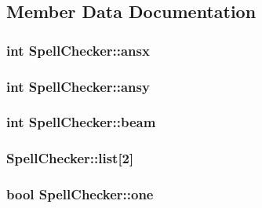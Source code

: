 \subsection{Member Data Documentation}
\hypertarget{class_spell_checker_a7c04bca12734e76005fe2535a3698ea5}{
\subsubsection[{ansx}]{\setlength{\rightskip}{0pt plus 5cm}int Spell\+Checker\+::ansx\hspace{0.3cm}{\ttfamily [private]}}}\label{class_spell_checker_a7c04bca12734e76005fe2535a3698ea5}
\hypertarget{class_spell_checker_aca76cb3fc436ef3970a100a950c4f11a}{
\subsubsection[{ansy}]{\setlength{\rightskip}{0pt plus 5cm}int Spell\+Checker\+::ansy\hspace{0.3cm}{\ttfamily [private]}}}\label{class_spell_checker_aca76cb3fc436ef3970a100a950c4f11a}
\hypertarget{class_spell_checker_acaf7176c06b86947773cbb83d7574783}{
\subsubsection[{beam}]{\setlength{\rightskip}{0pt plus 5cm}int Spell\+Checker\+::beam\hspace{0.3cm}{\ttfamily [protected]}}}\label{class_spell_checker_acaf7176c06b86947773cbb83d7574783}
\hypertarget{class_spell_checker_a935dea2584e5fdec80a2fe07e5cb08c3}{
\subsubsection[{list}]{ Spell\+Checker\+::list\mbox{[}2\mbox{]}}}\label{class_spell_checker_a935dea2584e5fdec80a2fe07e5cb08c3}
\hypertarget{class_spell_checker_a95d95e0ded8b4e1493a406746e509866}{
\subsubsection[{one}]{\setlength{\rightskip}{0pt plus 5cm}bool Spell\+Checker\+::one\hspace{0.3cm}{\ttfamily [private]}}}\label{class_spell_checker_a95d95e0ded8b4e1493a406746e509866}
